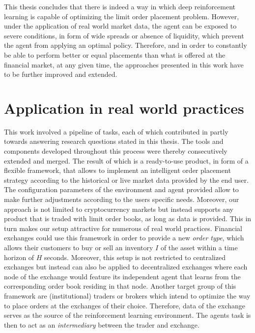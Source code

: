 This thesis concludes that there is indeed a way in which deep reinforcement learning is capable of optimizing the limit order placement problem.
However, under the application of real world market data, the agent can be exposed to severe conditions, in form of wide spreads or absence of liquidity, which prevent the agent from applying an optimal policy.
Therefore, and in order to constantly be able to perform better or equal placements than what is offered at the financial market, at any given time, the approaches presented in this work have to be further improved and extended.

\section{Application in real world practices}

This work involved a pipeline of tasks, each of which contributed in partly towards answering research questions stated in this thesis.
The tools and components developed throughout this process were thereby consecutively extended and merged.
The result of which is a ready-to-use product, in form of a flexible framework, that allows to implement an intelligent order placement strategy according to the historical or live market data provided by the end user.
The configuration parameters of the environment and agent provided allow to make further adjustments according to the users specific needs.
Moreover, our approach is not limited to cryptocurrency markets but instead supports any product that is traded with limit order books, as long as data is provided.
This in turn makes our setup attractive for numerous of real world practices.
Financial exchanges could use this framework in order to provide a new \textit{order type}, which allows their customers to buy or sell an inventory $I$ of the asset within a time horizon of $H$ seconds.
Moreover, this setup is not restricted to centralized exchanges but instead can also be applied to decentralized exchanges where each node of the exchange would feature its independent agent that learns from the corresponding order book residing in that node.
Another target group of this framework are (institutional) traders or brokers which intend to optimize the way to place orders at the exchanges of their choice.
Therefore, data of the exchange serves as the source of the reinforcement learning environment. 
The agents task is then to act as an \textit{intermediary} between the trader and exchange.
